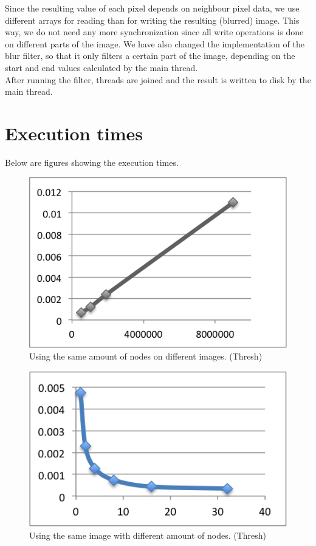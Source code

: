 \documentclass[a4paper]{article}
\begin{document}
Since the resulting value of each pixel depends on neighbour pixel data,
we use different arrays for reading than for writing the resulting
(blurred) image. This way, we do not need any more synchronization since
all write operations is done on different parts of the image. We have
also changed the implementation of the blur filter, so that it only
filters a certain part of the image, depending on the start and end
values calculated by the main thread.\\

After running the filter, threads are joined and the result is written
to disk by the main thread.

\section{Execution times}
Below are figures showing the execution times.
\begin{figure}
  \centering
  \includegraphics{processor.png}
  \caption{Using the same amount of nodes on different images. (Thresh)}
  \label{tab:fig1}
\end{figure}

\begin{figure}
  \centering
  \includegraphics{image.png}
  \caption{Using the same image with different amount of nodes. (Thresh)}
  \label{tab:fig2}
\end{figure}
\end{document}
